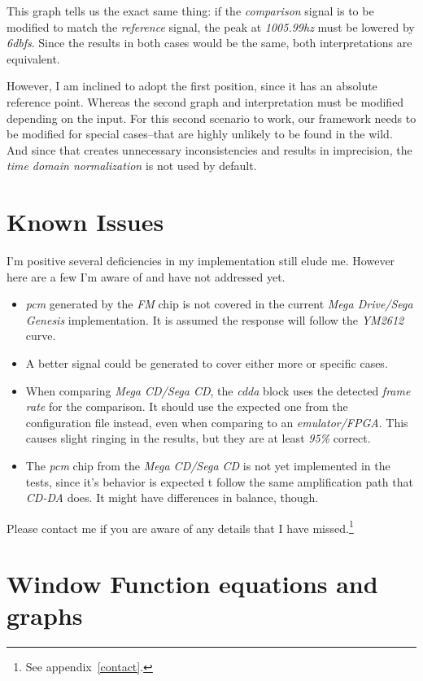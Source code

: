 \documentclass[10pt,a4paper]{report}
\newcommand{\ac}[1]{\textit{\mbox{\acrshort{#1}}}}
\newcommand{\hz}[1]{\textit{\mbox{#1\acrshort{hz}}}}
\newcommand{\db}[1]{\textit{\mbox{#1\acrshort{dbfs}}}}
\begin{document}
\begin{appendices}
This graph tells us the exact same thing: if the \textit{comparison} signal is to be modified to match the \textit{reference} signal, the peak at \hz{1005.99} must be lowered by \db{6}. Since the results in both cases would be the same, both interpretations are equivalent.
	
However, I am inclined to adopt the first position, since it has an absolute reference point. Whereas the second graph and interpretation must be modified depending on the input. For this second scenario to work, our framework needs to be modified for special cases--that are highly unlikely to be found in the wild. And since that creates unnecessary inconsistencies and results in imprecision, the \textit{time domain normalization} is not used by default.

\chapter{Known Issues}

I'm positive several deficiencies in my implementation still elude me. However here are a few I'm aware of and have not addressed yet.

\begin{itemize}
	\item \ac{pcm} generated by the \textit{FM} chip is not covered in the current \textit{Mega Drive/Sega Genesis} implementation. It is assumed the response will follow the \textit{YM2612} curve.
	\item A better signal could  be generated to cover either more or specific cases.
	\item When comparing \textit{Mega CD/Sega CD}, the \textit{\ac{cdda}} block uses the detected \textit{frame rate} for the comparison. It should use the expected one from the configuration file instead, even when comparing to an \textit{emulator/FPGA}. This causes slight ringing in the results, but they are at least \textit{95\%} correct.
	\item The \ac{pcm} chip from the \textit{Mega CD/Sega CD} is not yet implemented in the tests, since it's behavior is expected t follow the same amplification path that \textit{CD-DA} does. It might have differences in balance, though.
\end{itemize}

Please contact me if you are aware of any details that I have missed.\footnote{See appendix~\ref{contact}.}

\chapter{Window Function equations and graphs}
\label{windowfunctiondetails}


\end{appendices}
\end{document}
